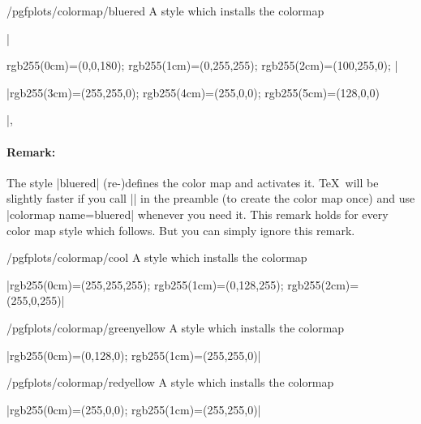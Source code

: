 \begin{stylekey}{/pgfplots/colormap/bluered}
	A style which installs the colormap

	|{rgb255(0cm)=(0,0,180); rgb255(1cm)=(0,255,255); rgb255(2cm)=(100,255,0); |

	|rgb255(3cm)=(255,255,0); rgb255(4cm)=(255,0,0); rgb255(5cm)=(128,0,0)}|,


\begin{codeexample}[]
\end{codeexample}

	\paragraph{Remark:} 
	The style |bluered| (re-)defines the color map and activates it. \TeX\ will be slightly faster if you call |\pgfplotsset{colormap/bluered}| in the preamble (to create the color map once) and use |colormap name=bluered| whenever you need it. This remark holds for every color map style which follows. But you can simply ignore this remark.
\end{stylekey}

\begin{stylekey}{/pgfplots/colormap/cool}
	A style which installs the colormap

	|{rgb255(0cm)=(255,255,255); rgb255(1cm)=(0,128,255); rgb255(2cm)=(255,0,255)}|

\end{stylekey}

\begin{stylekey}{/pgfplots/colormap/greenyellow}
	A style which installs the colormap

	|{rgb255(0cm)=(0,128,0); rgb255(1cm)=(255,255,0)}|

\end{stylekey}

\begin{stylekey}{/pgfplots/colormap/redyellow}
	A style which installs the colormap

	|{rgb255(0cm)=(255,0,0); rgb255(1cm)=(255,255,0)}|

\end{stylekey}

